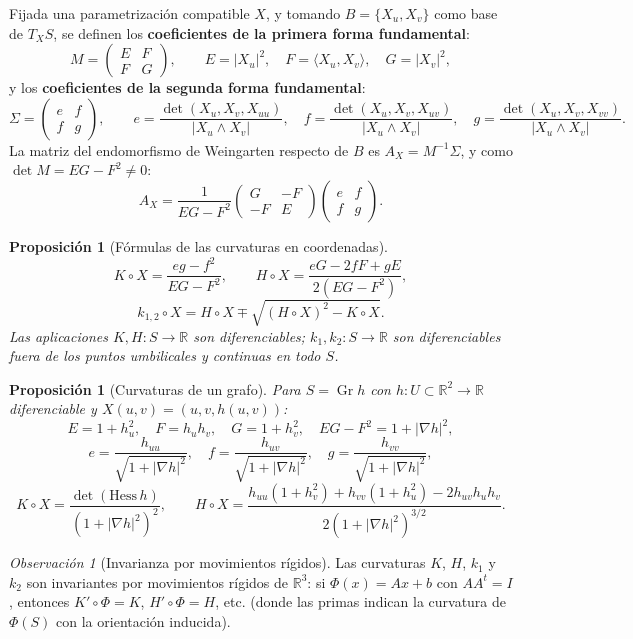 \documentclass[11pt]{article}
\DeclareMathOperator{\Gr}{Gr}
\theoremstyle{plain}
\newtheorem{proposicion}[teorema]{Proposición}
\theoremstyle{definition}
\theoremstyle{remark}
\newtheorem{observacion}[teorema]{Observación}
\begin{document}
\noindent
Fijada una parametrización compatible $X$, y tomando $B=\{X_u,X_v\}$ como base de $T_XS$, se definen los \textbf{coeficientes de la primera forma fundamental}:
\[
M = \begin{pmatrix} E & F \\ F & G \end{pmatrix}, \qquad E=|X_u|^2,\quad F=\langle X_u,X_v\rangle,\quad G=|X_v|^2,
\]
y los \textbf{coeficientes de la segunda forma fundamental}:
\[
\Sigma = \begin{pmatrix} e & f \\ f & g \end{pmatrix}, \qquad e = \frac{\det(X_u,X_v,X_{uu})}{|X_u\land X_v|},\quad f = \frac{\det(X_u,X_v,X_{uv})}{|X_u\land X_v|},\quad g = \frac{\det(X_u,X_v,X_{vv})}{|X_u\land X_v|}.
\]
La matriz del endomorfismo de Weingarten respecto de $B$ es $A_X = M^{-1}\Sigma$, y como $\det M = EG-F^2\neq 0$:
\[
A_X = \frac{1}{EG-F^2}\begin{pmatrix} G & -F \\ -F & E \end{pmatrix}\begin{pmatrix} e & f \\ f & g \end{pmatrix}.
\]

\begin{proposicion}[Fórmulas de las curvaturas en coordenadas]
\[
K\circ X = \frac{eg-f^2}{EG-F^2}, \qquad H\circ X = \frac{eG-2fF+gE}{2(EG-F^2)},
\]
\[
k_{1,2}\circ X = H\circ X \mp \sqrt{(H\circ X)^2 - K\circ X}.
\]
Las aplicaciones $K,H:S\to\mathbb{R}$ son diferenciables; $k_1,k_2:S\to\mathbb{R}$ son diferenciables fuera de los puntos umbilicales y continuas en todo $S$.
\end{proposicion}

\begin{proposicion}[Curvaturas de un grafo]
Para $S = \Gr h$ con $h:U\subset\mathbb{R}^2\to\mathbb{R}$ diferenciable y $X(u,v)=(u,v,h(u,v))$:
\[
E = 1+h_u^2,\quad F = h_u h_v,\quad G = 1+h_v^2,\quad EG-F^2 = 1+|\nabla h|^2,
\]
\[
e = \frac{h_{uu}}{\sqrt{1+|\nabla h|^2}},\quad f = \frac{h_{uv}}{\sqrt{1+|\nabla h|^2}},\quad g = \frac{h_{vv}}{\sqrt{1+|\nabla h|^2}},
\]
\[
K\circ X = \frac{\det(\mathrm{Hess}\, h)}{(1+|\nabla h|^2)^2}, \qquad H\circ X = \frac{h_{uu}(1+h_v^2)+h_{vv}(1+h_u^2)-2h_{uv}h_uh_v}{2(1+|\nabla h|^2)^{3/2}}.
\]
\end{proposicion}

\begin{observacion}[Invarianza por movimientos rígidos]
Las curvaturas $K$, $H$, $k_1$ y $k_2$ son invariantes por movimientos rígidos de $\mathbb{R}^3$: si $\Phi(x)=Ax+b$ con $AA^t=I$, entonces $K'\circ\Phi = K$, $H'\circ\Phi = H$, etc. (donde las primas indican la curvatura de $\Phi(S)$ con la orientación inducida).
\end{observacion}
\end{document}
